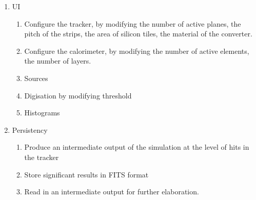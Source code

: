 \begin{enumerate}
    \item UI
	\begin{enumerate}
	    \item Configure the tracker, by modifying the number of active
		planes, the pitch of the strips, the area of silicon tiles,
		the material of the converter.
	    \item Configure the calorimeter, by modifying the number of
		active elements, the number of layers.
	    \item Sources
	    \item Digisation by modifying threshold
	    \item Histograms
	\end{enumerate}
    \item Persistency
	\begin{enumerate}
	    \item Produce an intermediate output of the simulation at the
		level of hits in the tracker
	    \item Store significant results in FITS format
	    \item Read in an intermediate output for further elaboration.
	\end{enumerate}
\end{enumerate}
